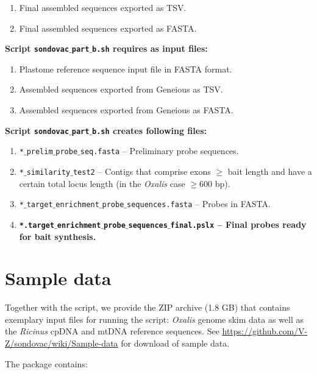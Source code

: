 \documentclass[a4paper, 11pt, twoside]{article}
\begin{document}
\begin{enumerate}
  \item Final assembled sequences exported as TSV.
  \item Final assembled sequences exported as FASTA.
\end{enumerate}

\textbf{Script \texttt{sondovac$\_$part$\_$b.sh} requires as input files:}

\begin{enumerate}
  \item Plastome reference sequence input file in FASTA format.
  \item Assembled sequences exported from Geneious as TSV.
  \item Assembled sequences exported from Geneious as FASTA.
\end{enumerate}

\textbf{Script \texttt{sondovac$\_$part$\_$b.sh} creates following files:}

\begin{enumerate}
  \item \texttt{*$\_$prelim$\_$probe$\_$seq.fasta} -- Preliminary probe sequences.
  \item \texttt{*$\_$similarity$\_$test2} -- Contigs that comprise exons $\geq$ bait length and have a certain total locus length (in the \textit{Oxalis} case $\geq$600 bp).
  \item \texttt{*$\_$target$\_$enrichment$\_$probe$\_$sequences.fasta} -- Probes in FASTA.
  \item \textbf{\texttt{*.target$\_$enrichment$\_$probe$\_$sequences$\_$final.pslx} -- Final probes ready for bait synthesis.}
\end{enumerate}

\section{Sample data}

Together with the script, we provide the ZIP archive (1.8 GB) that contains exemplary input files for running the script: \textit{Oxalis} genome skim data as well as the \textit{Ricinus} cpDNA and mtDNA reference sequences. See \href{https://github.com/V-Z/sondovac/wiki/Sample-data}{https://github.com/V-Z/sondovac/wiki/Sample-data} for download of sample data.

The package contains:
\end{document}
